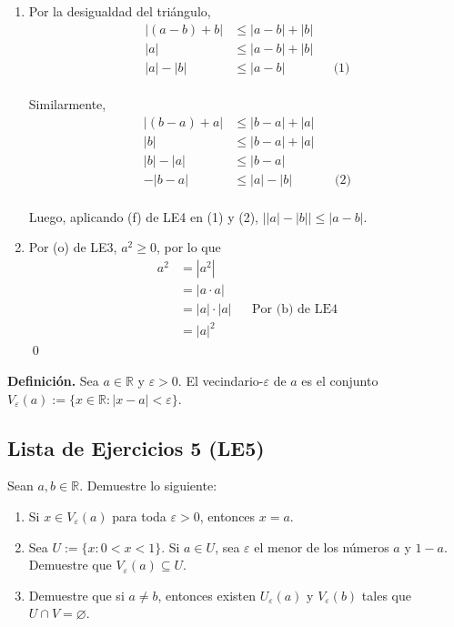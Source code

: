 \documentclass[11pt]{article}
\newcommand{\R}{\mathbb{R}}
\let\emptyset\varnothing
\begin{document}
\begin{enumerate}[label=\alph*),font=\bfseries]
    
    \item Por la desigualdad del triángulo,
        \begin{align*}
            |(a-b)+b| &\leq |a-b|+|b| \\
            |a| &\leq |a-b|+|b| \\
            |a|-|b| &\leq |a-b| && \text{(1)}
        \end{align*} \\
        Similarmente, 
        \begin{align*}
            |(b-a)+a| &\leq |b-a|+|a| \\
            |b| &\leq |b-a|+|a| \\
            |b|-|a| &\leq |b-a| \\
            -|b-a| &\leq |a|-|b| && \text{(2)}
        \end{align*} \\
        Luego, aplicando (f) de LE4 en (1) y (2), $\big| |a| - |b| \big| \leq |a-b|$.


    \item Por (o) de LE3, $a^2\geq 0$, por lo que \begin{align*}
        a^2 &= |a^2|\\
        &= |a\cdot a|\\
        &= |a| \cdot |a| && \text{Por (b) de LE4}\\
        &= |a|^2
    \end{align*} \qed
\end{enumerate} 


\textbf{Definición.} Sea $a \in \R$ y $\varepsilon>0$. El vecindario-$\varepsilon$ de $a$ es el conjunto $V_\varepsilon(a):=\{ x\in \R: |x-a|<\varepsilon\}$.

\subsection*{Lista de Ejercicios 5 (LE5)}

Sean $a,b \in \R$. Demuestre lo siguiente:

\begin{enumerate}[label=\alph*)]
    \item Si $x\in V_\varepsilon(a)$ para toda $\varepsilon>0$, entonces $x=a$.
    \item Sea $U:=\{x: 0<x<1\}$. Si $a\in U$, sea $\varepsilon$ el menor de los números $a$ y $1-a$. Demuestre que $V_\varepsilon(a) \subseteq U$.
    \item Demuestre que si $a\neq b$, entonces existen $U_\varepsilon(a)$ y $V_\varepsilon(b)$ tales que $U\cap V =\emptyset$.
\end{enumerate}
\end{document}
